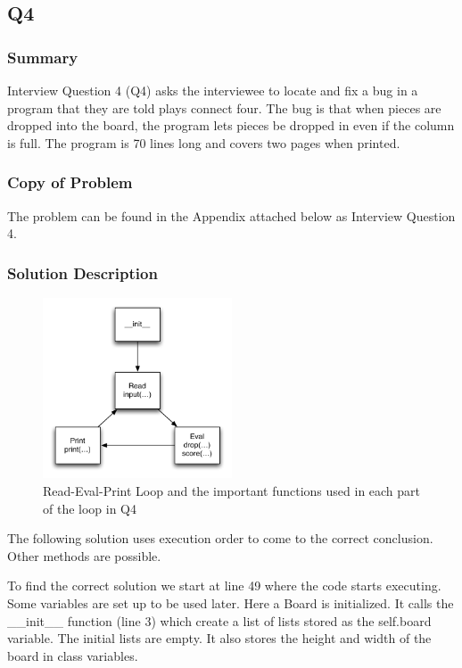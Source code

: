 \newpage
\subsection{Q4}
\subsubsection{Summary}
Interview Question 4 (Q4) asks the interviewee to locate and fix a bug in a program that they are told plays connect four.
The bug is that when pieces are dropped into the board, the program lets pieces be dropped in even if the column is full.
The program is 70 lines long and covers two pages when printed.
\subsubsection{Copy of Problem}
The problem can be found in the Appendix attached below as Interview Question 4.

\subsubsection{Solution Description}
\begin{figure}[t]
\centering
\includegraphics[width=0.5\textwidth]{Q4diagram.pdf}
\caption{Read-Eval-Print Loop and the important functions used in each part of the loop in Q4}
\label{fig-q2}
\end{figure}

The following solution uses execution order to come to the correct conclusion. Other methods are possible. 

To find the correct solution we start at line 49 where the code starts executing.
Some variables are set up to be used later. 
Here a Board is initialized.
It calls the \_\_init\_\_ function (line 3) which create a list of lists stored as the self.board variable.
The initial lists are empty.
It also stores the height and width of the board in class variables. 

